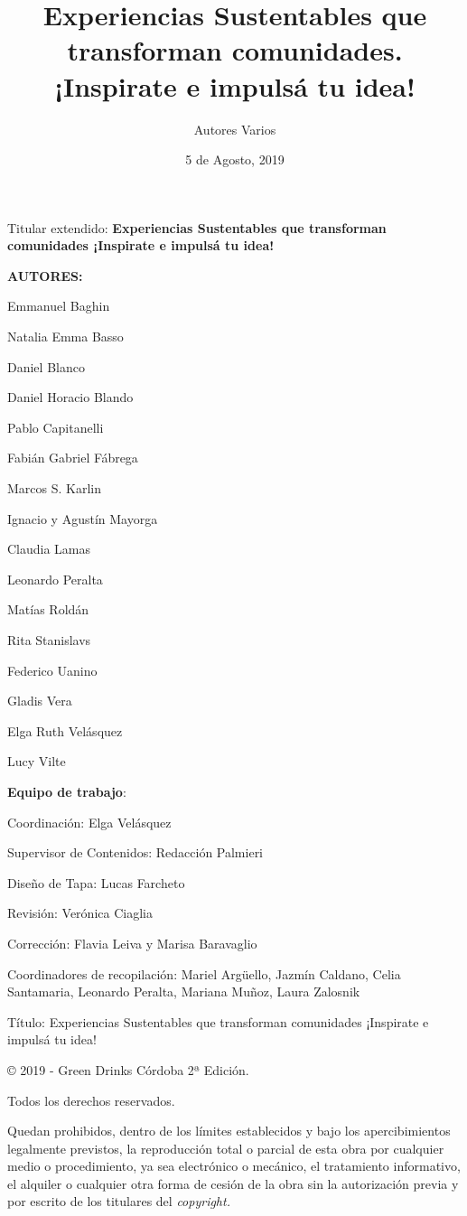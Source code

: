 \documentclass[
]{article}
\title{Experiencias Sustentables que transforman comunidades. ¡Inspirate e
impulsá tu idea!}
\author{Autores Varios}
\date{5 de Agosto, 2019}
\begin{document}
\maketitle

\newpage

Titular extendido: \textbf{Experiencias Sustentables que transforman
comunidades ¡Inspirate e impulsá tu idea!}

\textbf{AUTORES:}

Emmanuel Baghin

Natalia Emma Basso

Daniel Blanco

Daniel Horacio Blando

Pablo Capitanelli

Fabián Gabriel Fábrega

Marcos S. Karlin

Ignacio y Agustín Mayorga

Claudia Lamas

Leonardo Peralta

Matías Roldán

Rita Stanislavs

Federico Uanino

Gladis Vera

Elga Ruth Velásquez

Lucy Vilte

\textbf{Equipo de trabajo}:

Coordinación: Elga Velásquez

Supervisor de Contenidos: Redacción Palmieri

Diseño de Tapa: Lucas Farcheto

Revisión: Verónica Ciaglia

Corrección: Flavia Leiva y Marisa Baravaglio

Coordinadores de recopilación: Mariel Argüello, Jazmín Caldano, Celia
Santamaria, Leonardo Peralta, Mariana Muñoz, Laura Zalosnik

\newpage

Título: Experiencias Sustentables que transforman comunidades ¡Inspirate
e impulsá tu idea!

© 2019 - Green Drinks Córdoba 2ª Edición.

Todos los derechos reservados.

Quedan prohibidos, dentro de los límites establecidos y bajo los
apercibimientos legalmente previstos, la reproducción total o parcial de
esta obra por cualquier medio o procedimiento, ya sea electrónico o
mecánico, el tratamiento informativo, el alquiler o cualquier otra forma
de cesión de la obra sin la autorización previa y por escrito de los
titulares del \emph{copyright.}
\end{document}
